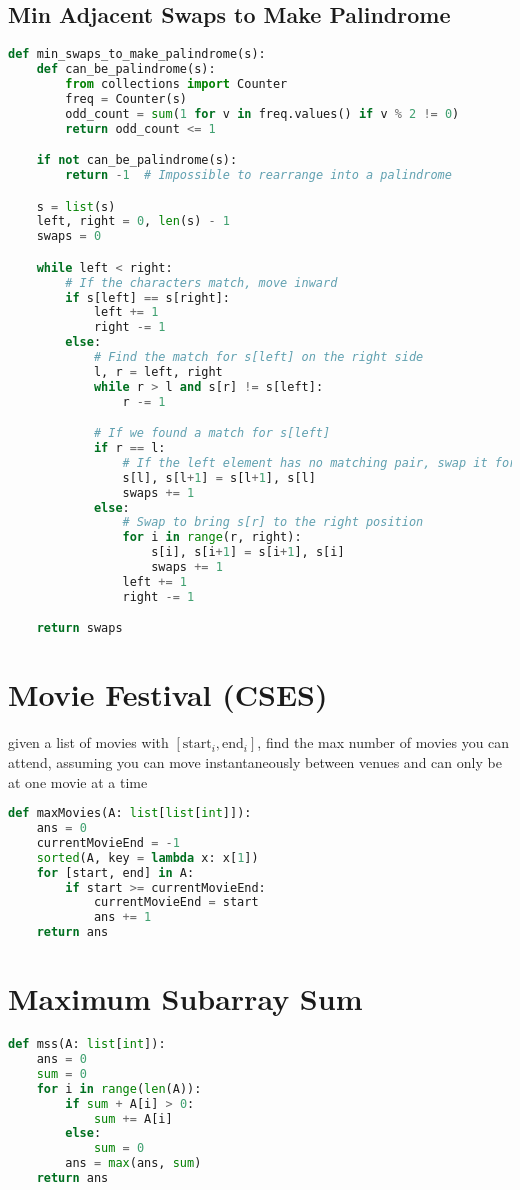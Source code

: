 \documentclass[11pt]{article}
\begin{document}
\subsection{Min Adjacent Swaps to Make Palindrome}

\begin{lstlisting}[language=Python]
def min_swaps_to_make_palindrome(s):
    def can_be_palindrome(s):
        from collections import Counter
        freq = Counter(s)
        odd_count = sum(1 for v in freq.values() if v % 2 != 0)
        return odd_count <= 1

    if not can_be_palindrome(s):
        return -1  # Impossible to rearrange into a palindrome

    s = list(s)
    left, right = 0, len(s) - 1
    swaps = 0

    while left < right:
        # If the characters match, move inward
        if s[left] == s[right]:
            left += 1
            right -= 1
        else:
            # Find the match for s[left] on the right side
            l, r = left, right
            while r > l and s[r] != s[left]:
                r -= 1

            # If we found a match for s[left]
            if r == l:
                # If the left element has no matching pair, swap it forward (for odd-length strings)
                s[l], s[l+1] = s[l+1], s[l]
                swaps += 1
            else:
                # Swap to bring s[r] to the right position
                for i in range(r, right):
                    s[i], s[i+1] = s[i+1], s[i]
                    swaps += 1
                left += 1
                right -= 1

    return swaps
\end{lstlisting}

\section{Movie Festival (CSES)}
given a list of movies with $[\text{start}_{i}, \text{end}_{i}]$, find the max number of movies you can attend, assuming you can move instantaneously between venues and can only be at one movie at a time
\begin{lstlisting}[language=Python]
def maxMovies(A: list[list[int]]):
	ans = 0
	currentMovieEnd = -1
	sorted(A, key = lambda x: x[1])
	for [start, end] in A:
		if start >= currentMovieEnd:
			currentMovieEnd = start
			ans += 1
	return ans
\end{lstlisting}

\section{Maximum Subarray Sum}
\begin{lstlisting}[language=Python]
def mss(A: list[int]):
	ans = 0
	sum = 0
	for i in range(len(A)):
		if sum + A[i] > 0:
			sum += A[i]
		else:
			sum = 0
		ans = max(ans, sum)
	return ans
\end{lstlisting}
\end{document}
